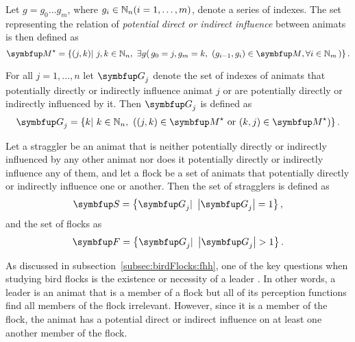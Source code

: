 Let $g=g_0\ldots g_m$, where $g_i \in \mathbb{N}_n (i=1,\ldots,m)$, denote a series of indexes. The set representing the relation of \emph{potential direct or indirect influence} between animats is then defined as
%
\begin{equation}
  \set{M}^\star= \left\{ (j,k)|\ j, k \in \N_n,\ \exists g \right(g_0=j, g_m=k,\ (g_{i-1}, g_i) \in \set{M}, \forall i \in \N_m\left) \right\}. \label{eq:metric:M*}
\end{equation}

For all $j=1,\ldots,n$ let $\set{G}_j$ denote the set of indexes of animats that potentially directly or indirectly influence animat $j$ or are potentially directly or indirectly influenced by it. Then $\set{G}_j$ is defined as
%
\begin{equation}
  \set{G}_j=\left\{k|\ k \in \N_n,\ \left((j,k) \in \set{M}^\star\ \mathrm{or}\ (k,j) \in \set{M}^\star\right) \right\}. \label{eq:metric:Gi}
\end{equation}

Let a straggler be an animat that is neither potentially directly or indirectly influenced by any other animat nor does it potentially directly or indirectly influence any of them, and let a flock be a set of animats that potentially directly or indirectly influence one or another. Then the set of stragglers is defined as
%
\begin{equation}
  \set{S}=\left\{ \set{G}_j|\ \left|\set{G}_j\right|=1 \right\}, \label{eq:stragglers}
\end{equation}
%
and the set of flocks as
%
\begin{equation}
  \set{F}=\left\{ \set{G}_j|\ \left|\set{G}_j\right|>1 \right\}. \label{eq:metric:flocks}
\end{equation}

As discussed in subsection~\ref{subsec:birdFlocks:fhh}, one of the key questions when studying bird flocks is the existence or necessity of a leader \cite{heppner:1997}.  In other words, a leader is an animat that is a member of a flock but all of its perception functions find all members of the flock irrelevant. However, since it is a member of the flock, the animat has a potential direct or indirect influence on at least one another member of the flock.

